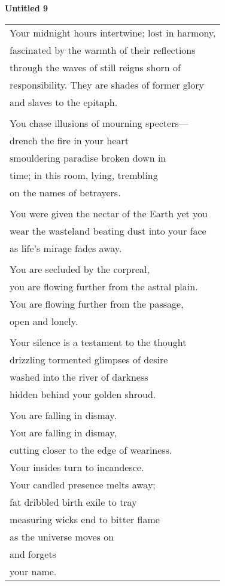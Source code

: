 \documentclass{article}
\begin{document}
\begin{center}
\textbf{Untitled 9} \\
\vspace*{2ex}
\begin{tabular}{l}
Your midnight hours intertwine; lost in harmony, \\
fascinated by the warmth of their reflections \\
through the waves of still reigns shorn of \\
responsibility.  They are shades of former glory \\
and slaves to the epitaph. \\
\\
You chase illusions of mourning specters--- \\
drench the fire in your heart \\
smouldering paradise broken down in \\
time; in this room, lying, trembling \\
on the names of betrayers. \\
\\
You were given the nectar of the Earth yet you \\
wear the wasteland beating dust into your face \\
as life's mirage fades away. \\
\\
You are secluded by the corpreal, \\
you are flowing further from the astral plain. \\ %
You are flowing further from the passage, \\
open and lonely. \\ %
\\
Your silence is a testament to the thought \\
drizzling tormented glimpses of desire \\
washed into the river of darkness \\
hidden behind your golden shroud. \\
\\
You are falling in dismay. \\
You are falling in dismay, \\
cutting closer to the edge of weariness. \\
Your insides turn to incandesce. \\
Your candled presence melts away; \\
fat dribbled birth exile to tray \\
measuring wicks end to bitter flame \\
as the universe moves on \\
and forgets \\
your name. \\
\end{tabular}
\end{center}
\end{document}
